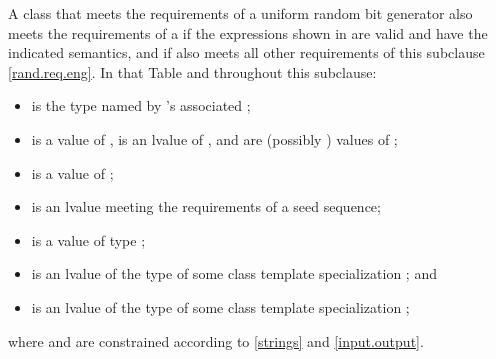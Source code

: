 \pnum
A class 
that meets the requirements
of a uniform random bit generator
also meets the requirements
of a 
if the expressions shown
in 
are valid and have the indicated semantics,
and if  also meets all other requirements
of this subclause \ref{rand.req.eng}.
In that Table and throughout this subclause:
\begin{itemize}
  \item
     is the type named by
    's associated ;
  \item
     is a value of ,
     is an lvalue of ,
     and  are (possibly ) values of ;
  \item
     is a value of ;
  \item
     is an lvalue
    meeting the requirements of a seed sequence;
  \item
     is a value
    of type ;
  \item
     is an lvalue of the type of some class template specialization
     ;
  and
  \item
     is an lvalue of the type of some class template specialization
     ;
\end{itemize}
where  and  are constrained
according to \ref{strings} and \ref{input.output}.

